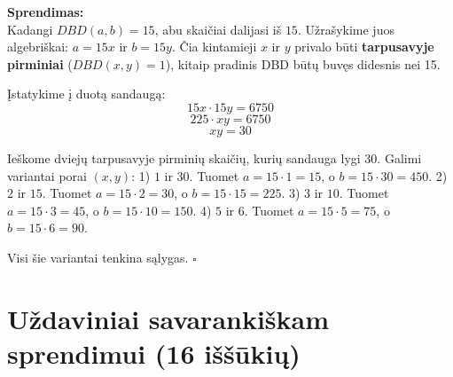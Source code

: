 \documentclass[11pt,a4paper]{scrartcl}
\newenvironment{solution}
    {\begin{list}{}{\setlength{\leftmargin}{10pt}\setlength{\rightmargin}{10pt}}\item[]}
    {\end{list}}
\begin{document}
\begin{solution}
\textbf{Sprendimas:}\\
Kadangi $DBD(a, b) = 15$, abu skaičiai dalijasi iš $15$. 
Užrašykime juos algebriškai: $a = 15x$ ir $b = 15y$. 
Čia kintamieji $x$ ir $y$ privalo būti \textbf{tarpusavyje pirminiai} ($DBD(x, y) = 1$), kitaip pradinis DBD būtų buvęs didesnis nei 15.

Įstatykime į duotą sandaugą:
\[ 15x \cdot 15y = 6750 \]
\[ 225 \cdot xy = 6750 \]
\[ xy = 30 \]

Ieškome dviejų tarpusavyje pirminių skaičių, kurių sandauga lygi 30.
Galimi variantai porai $(x, y)$:
1) $1$ ir $30$.  Tuomet $a = 15 \cdot 1 = 15$, o $b = 15 \cdot 30 = 450$.
2) $2$ ir $15$.  Tuomet $a = 15 \cdot 2 = 30$, o $b = 15 \cdot 15 = 225$.
3) $3$ ir $10$.  Tuomet $a = 15 \cdot 3 = 45$, o $b = 15 \cdot 10 = 150$.
4) $5$ ir $6$.   Tuomet $a = 15 \cdot 5 = 75$, o $b = 15 \cdot 6 = 90$.

Visi šie variantai tenkina sąlygas. \hfill $\square$
\end{solution}

\vspace{0.5cm}

\newpage
\section{Uždaviniai savarankiškam sprendimui (16 iššūkių)}
\end{document}

